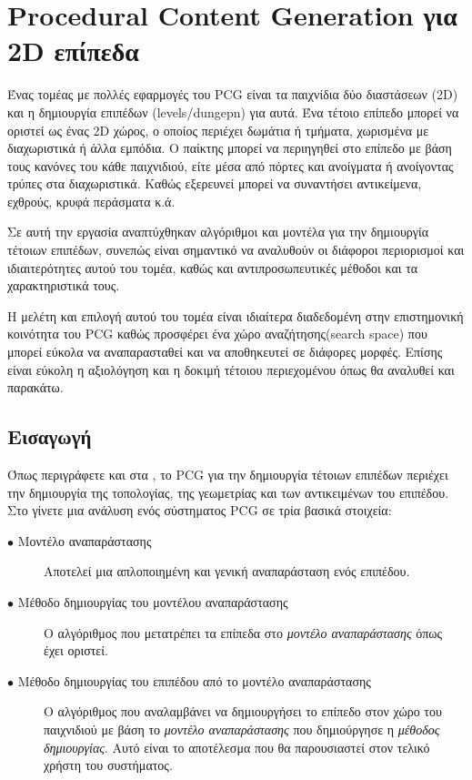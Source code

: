 \vspace{60mm}

\section{Procedural Content Generation για 2D επίπεδα}

Ένας τομέας με πολλές εφαρμογές του PCG είναι τα παιχνίδια δύο διαστάσεων (2D) και η δημιουργία επιπέδων (levels/dungepn) για αυτά. Ένα τέτοιο επίπεδο μπορεί να οριστεί ως ένας 2D χώρος, ο οποίος περιέχει δωμάτια ή τμήματα, χωρισμένα με διαχωριστικά ή άλλα εμπόδια. Ο παίκτης μπορεί να περιηγηθεί στο επίπεδο με βάση τους κανόνες του κάθε παιχνιδιού, είτε μέσα από πόρτες και ανοίγματα ή ανοίγοντας τρύπες στα διαχωριστικά. Καθώς εξερευνεί μπορεί να συναντήσει αντικείμενα, εχθρούς, κρυφά περάσματα κ.ά. 
\par
Σε αυτή την εργασία αναπτύχθηκαν αλγόριθμοι και μοντέλα για την δημιουργία τέτοιων επιπέδων, συνεπώς είναι σημαντικό να αναλυθούν οι διάφοροι περιορισμοί και ιδιαιτερότητες αυτού του τομέα, καθώς και αντιπροσωπευτικές μέθοδοι και τα χαρακτηριστικά τους.
\par
Η μελέτη και επιλογή αυτού του τομέα είναι ιδιαίτερα διαδεδομένη στην επιστημονική κοινότητα του PCG καθώς προσφέρει ένα χώρο αναζήτησης(search space) που μπορεί εύκολα να αναπαρασταθεί και να αποθηκευτεί σε διάφορες μορφές. Επίσης είναι εύκολη η αξιολόγηση και η δοκιμή τέτοιου περιεχομένου όπως θα αναλυθεί και παρακάτω.

\subsection{Εισαγωγή}
Όπως περιγράφετε και στα \cite{pcgieee} \cite{pcgig}, το PCG για την δημιουργία τέτοιων επιπέδων περιέχει την δημιουργία της τοπολογίας, της γεωμετρίας και των αντικειμένων του επιπέδου. Στο \cite{pcgig} γίνετε μια ανάλυση ενός σύστηματος PCG σε τρία βασικά στοιχεία:

\begin{description}
  \item[$\bullet$ Μοντέλο αναπαράστασης] Αποτελεί μια απλοποιημένη και γενική αναπαράσταση ενός επιπέδου.
  \item[$\bullet$ Μέθοδο δημιουργίας του μοντέλου αναπαράστασης] Ο αλγόριθμος που μετατρέπει τα επίπεδα στο \textit{μοντέλο αναπαράστασης} όπως έχει οριστεί. 
    \item[$\bullet$ Μέθοδο δημιουργίας του επιπέδου από το μοντέλο αναπαράστασης] Ο αλγόριθμος που αναλαμβάνει να δημιουργήσει το επίπεδο στον χώρο του παιχνιδιού με βάση το \textit{μοντέλο αναπαράστασης} που δημιούργησε η \textit{μέθοδος δημιουργίας}. Αυτό είναι το αποτέλεσμα που θα παρουσιαστεί στον τελικό χρήστη του συστήματος.
\end{description}

